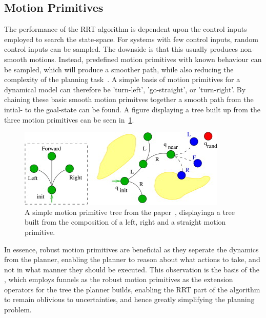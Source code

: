 \subsection{Motion Primitives}

The performance of the \ac{RRT} algorithm is dependent upon the control inputs
employed to search the state-space. For systems with few control inputs, random
control inputs can be sampled. The downside is that this usually produces
non-smooth motions. Instead, predefined motion primitives with known behaviour
can be sampled, which will produce a smoother path, while also reducing the
complexity of the planning
task~\cite{vonasekGlobalMotionPlanning2013,hauserUsingMotionPrimitives2008}. A
simple basis of motion primitives for a dynamical model can therefore be
'turn-left', 'go-straight', or 'turn-right'. By chaining these basic smooth
motion primitves together a smooth path from the intial- to the goal-state can
be found. A figure displaying a tree built up from the three motion primitives
can be seen in~\cref{fig:motion-primitive-tree}.

\begin{figure}
  \centering
  \includegraphics[scale=1]{figures/preliminaries/motion-primitive-tree}
  \caption{A simple motion primitive tree from the
    paper~\cite{vonasekHighlevelMotionPlanning2015}, displayinga a tree built
    from the composition of a left, right and a straight motion primitive.}
  \label{fig:motion-primitive-tree}
\end{figure}

In essence, robust motion primitives are beneficial as they seperate the
dynamics from the planner, enabling the planner to reason about what actions to
take, and not in what manner they should be executed. This observation is the
basis of the \rrtfunnel{}, which employs funnels as the robust motion primitives
as the extension operators for the tree the planner builds, enabling the
\ac{RRT} part of the \rrtfunnel{} algorithm to remain oblivious to
uncertainties, and hence greatly simplifying the planning problem.


